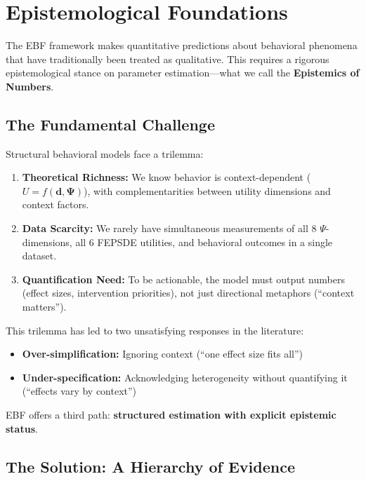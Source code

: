 \documentclass[11pt,a4paper]{article}
\theoremstyle{definition}
\begin{document}
\label{app:bbb-estimation}
\section{Epistemological Foundations}
\label{sec:bbb-epistemology}

The EBF framework makes quantitative predictions about behavioral phenomena 
that have traditionally been treated as qualitative. This requires a rigorous 
epistemological stance on parameter estimation---what we call the 
\textbf{Epistemics of Numbers}.

\subsection{The Fundamental Challenge}

Structural behavioral models face a trilemma:

\begin{enumerate}
    \item \textbf{Theoretical Richness:} We know behavior is context-dependent 
    ($U = f(\mathbf{d}, \boldsymbol{\Psi})$), with complementarities between 
    utility dimensions and context factors.
    
    \item \textbf{Data Scarcity:} We rarely have simultaneous measurements of all 
    8 $\Psi$-dimensions, all 6 FEPSDE utilities, and behavioral outcomes in a 
    single dataset.
    
    \item \textbf{Quantification Need:} To be actionable, the model must output 
    numbers (effect sizes, intervention priorities), not just directional 
    metaphors (``context matters'').
\end{enumerate}

This trilemma has led to two unsatisfying responses in the literature:
\begin{itemize}
    \item \textbf{Over-simplification:} Ignoring context (``one effect size fits all'')
    \item \textbf{Under-specification:} Acknowledging heterogeneity without 
    quantifying it (``effects vary by context'')
\end{itemize}

EBF offers a third path: \textbf{structured estimation with explicit 
epistemic status}.

\subsection{The Solution: A Hierarchy of Evidence}
\end{document}
